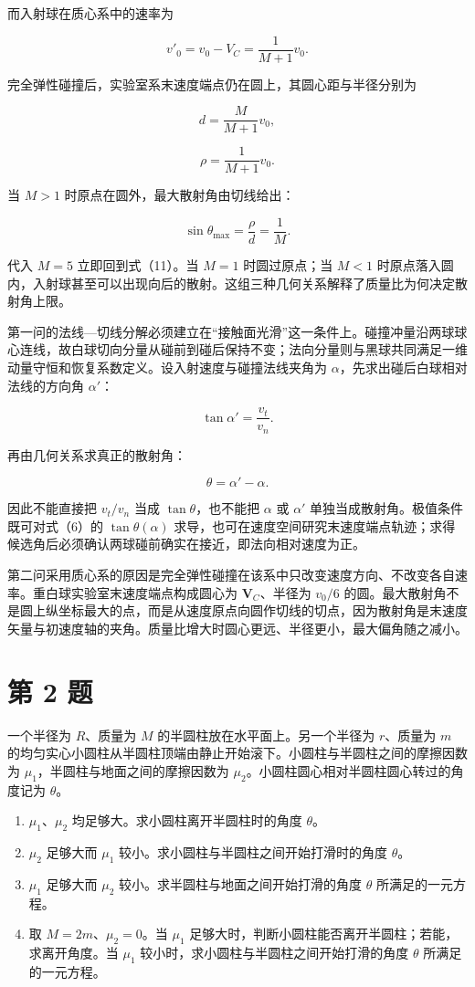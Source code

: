 \documentclass[12pt,a4paper,UTF8]{ctexart}
\newcommand{\tightlist}{\setlength{\itemsep}{0pt}\setlength{\parskip}{0pt}}
\begin{document}
而入射球在质心系中的速率为

\[v'_0=v_0-V_C=\frac{1}{M+1}v_0.\]

完全弹性碰撞后，实验室系末速度端点仍在圆上，其圆心距与半径分别为

\[d=\frac{M}{M+1}v_0,\]

\[\rho=\frac{1}{M+1}v_0.\]

当 \(M>1\) 时原点在圆外，最大散射角由切线给出：

\[\sin\theta_{\max}=\frac{\rho}{d}=\frac1M.\]

代入 \(M=5\) 立即回到式（11）。当 \(M=1\) 时圆过原点；当 \(M<1\)
时原点落入圆内，入射球甚至可以出现向后的散射。这组三种几何关系解释了质量比为何决定散射角上限。

第一问的法线---切线分解必须建立在``接触面光滑''这一条件上。碰撞冲量沿两球球心连线，故白球切向分量从碰前到碰后保持不变；法向分量则与黑球共同满足一维动量守恒和恢复系数定义。设入射速度与碰撞法线夹角为
\(\alpha\)，先求出碰后白球相对法线的方向角 \(\alpha'\)：

\[\tan\alpha'=\frac{v_t}{v_n}.\]

再由几何关系求真正的散射角：

\[\theta=\alpha'-\alpha.\]

因此不能直接把 \(v_t/v_n\) 当成 \(\tan\theta\)，也不能把 \(\alpha\) 或
\(\alpha'\) 单独当成散射角。极值条件既可对式（6）的
\(\tan\theta(\alpha)\)
求导，也可在速度空间研究末速度端点轨迹；求得候选角后必须确认两球碰前确实在接近，即法向相对速度为正。

第二问采用质心系的原因是完全弹性碰撞在该系中只改变速度方向、不改变各自速率。重白球实验室末速度端点构成圆心为
\(\boldsymbol V_C\)、半径为 \(v_0/6\)
的圆。最大散射角不是圆上纵坐标最大的点，而是从速度原点向圆作切线的切点，因为散射角是末速度矢量与初速度轴的夹角。质量比增大时圆心更远、半径更小，最大偏角随之减小。

\newpage

\section{第 2 题}\label{ux7b2c-2-ux9898}

一个半径为 \(R\)、质量为 \(M\) 的半圆柱放在水平面上。另一个半径为
\(r\)、质量为 \(m\)
的均匀实心小圆柱从半圆柱顶端由静止开始滚下。小圆柱与半圆柱之间的摩擦因数为
\(\mu_1\)，半圆柱与地面之间的摩擦因数为
\(\mu_2\)。小圆柱圆心相对半圆柱圆心转过的角度记为 \(\theta\)。

\begin{enumerate}
\def\labelenumi{\arabic{enumi}.}
\tightlist
\item
  \(\mu_1\)、\(\mu_2\) 均足够大。求小圆柱离开半圆柱时的角度 \(\theta\)。
\item
  \(\mu_2\) 足够大而 \(\mu_1\)
  较小。求小圆柱与半圆柱之间开始打滑时的角度 \(\theta\)。
\item
  \(\mu_1\) 足够大而 \(\mu_2\) 较小。求半圆柱与地面之间开始打滑的角度
  \(\theta\) 所满足的一元方程。
\item
  取 \(M=2m\)、\(\mu_2=0\)。当 \(\mu_1\)
  足够大时，判断小圆柱能否离开半圆柱；若能，求离开角度。当 \(\mu_1\)
  较小时，求小圆柱与半圆柱之间开始打滑的角度 \(\theta\)
  所满足的一元方程。
\end{enumerate}
\end{document}
